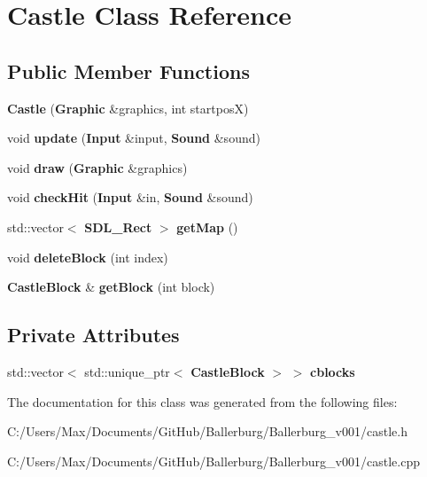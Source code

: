 \section{Castle Class Reference}
\label{class_castle}
\subsection*{Public Member Functions}
\begin{DoxyCompactItemize}
\item 
{\bfseries Castle} ({\bf Graphic} \&graphics, int startpos\+X)\label{class_castle_ab5ec93846d60e52722de92e45c753d4b}

\item 
void {\bfseries update} ({\bf Input} \&input, {\bf Sound} \&sound)\label{class_castle_a88b3dd90f1c6a9bc4f84deb5bed8ea97}

\item 
void {\bfseries draw} ({\bf Graphic} \&graphics)\label{class_castle_a0b25b9dead62c64e7e48a587453b1138}

\item 
void {\bfseries check\+Hit} ({\bf Input} \&in, {\bf Sound} \&sound)\label{class_castle_a8c40e91a3d1ae3dba9003607736c8076}

\item 
std\+::vector$<$ {\bf S\+D\+L\+\_\+\+Rect} $>$ {\bfseries get\+Map} ()\label{class_castle_a94e009f51990bf1fe4e65c6809848480}

\item 
void {\bfseries delete\+Block} (int index)\label{class_castle_a33d197526444e9899ff601342671efe2}

\item 
{\bf Castle\+Block} \& {\bfseries get\+Block} (int block)\label{class_castle_a540a311c65db41018f12a9da996f01b4}

\end{DoxyCompactItemize}
\subsection*{Private Attributes}
\begin{DoxyCompactItemize}
\item 
std\+::vector$<$ std\+::unique\+\_\+ptr$<$ {\bf Castle\+Block} $>$ $>$ {\bfseries cblocks}\label{class_castle_a6242b6b73f63cd62dcbfed916d3c49a7}

\end{DoxyCompactItemize}


The documentation for this class was generated from the following files\+:\begin{DoxyCompactItemize}
\item 
C\+:/\+Users/\+Max/\+Documents/\+Git\+Hub/\+Ballerburg/\+Ballerburg\+\_\+v001/castle.\+h\item 
C\+:/\+Users/\+Max/\+Documents/\+Git\+Hub/\+Ballerburg/\+Ballerburg\+\_\+v001/castle.\+cpp\end{DoxyCompactItemize}
